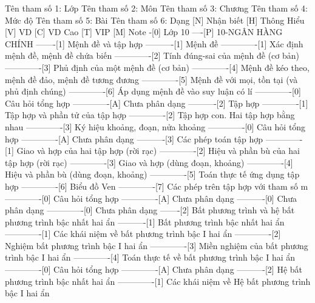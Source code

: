 %
%
%
%
%
Tên tham số 1: Lớp
Tên tham số 2: Môn
Tên tham số 3: Chương
Tên tham số 4: Mức độ
Tên tham số 5: Bài
Tên tham số 6: Dạng
%
%
[N] Nhận biết
[H] Thông Hiểu
[V] VD
[C] VD Cao
[T] VIP
[M] Note
%
%
-[0] Lớp 10
----[P] 10-NGÂN HÀNG CHÍNH
-------[1] Mệnh đề và tập hợp
----------[1] Mệnh đề
-------------[1] Xác định mệnh đề, mệnh đề chứa biến
-------------[2] Tính đúng-sai của mệnh đề (cơ bản)
-------------[3] Phủ định của một mệnh đề (cơ bản)
-------------[4] Mệnh đề kéo theo, mệnh đề đảo, mệnh đề tương đương
-------------[5] Mệnh đề với mọi, tồn tại (và phủ định chúng)
-------------[6] Áp dụng mệnh đề vào suy luận có lí
-------------[0] Câu hỏi tổng hợp
-------------[A] Chưa phân dạng
----------[2] Tập hợp
-------------[1] Tập hợp và phần tử của tập hợp
-------------[2] Tập hợp con. Hai tập hợp bằng nhau
-------------[3] Ký hiệu khoảng, đoạn, nửa khoảng
-------------[0] Câu hỏi tổng hợp
-------------[A] Chưa phân dạng
----------[3] Các phép toán tập hợp
-------------[1] Giao và hợp của hai tập hợp (rời rạc)
-------------[2] Hiệu và phần bù của hai tập hợp (rời rạc)
-------------[3] Giao và hợp (dùng đoạn, khoảng)
-------------[4] Hiệu và phần bù (dùng đoạn, khoảng)
-------------[5] Toán thực tế ứng dụng tập hợp
-------------[6] Biểu đồ Ven
-------------[7] Các phép trên tập hợp với tham số m
-------------[0] Câu hỏi tổng hợp
-------------[A] Chưa phân dạng
----------[0] Chưa phân dạng
-------------[0] Chưa phân dạng
-------[2] Bất phương trình và hệ bất phương trình bậc nhất hai ẩn
----------[1] Bất phương trình bậc nhất hai ẩn
-------------[1] Các khái niệm về bất phương trình bậc I hai ẩn
-------------[2] Nghiệm bất phương trình bậc I hai ẩn
-------------[3] Miền nghiệm của bất phương trình bậc I hai ẩn
-------------[4] Toán thực tế về bất phương trình bậc I hai ẩn
-------------[0] Câu hỏi tổng hợp
-------------[A] Chưa phân dạng
----------[2] Hệ bất phương trình bậc nhất hai ẩn
-------------[1] Các khái niệm về Hệ bất phương trình bậc I hai ẩn
